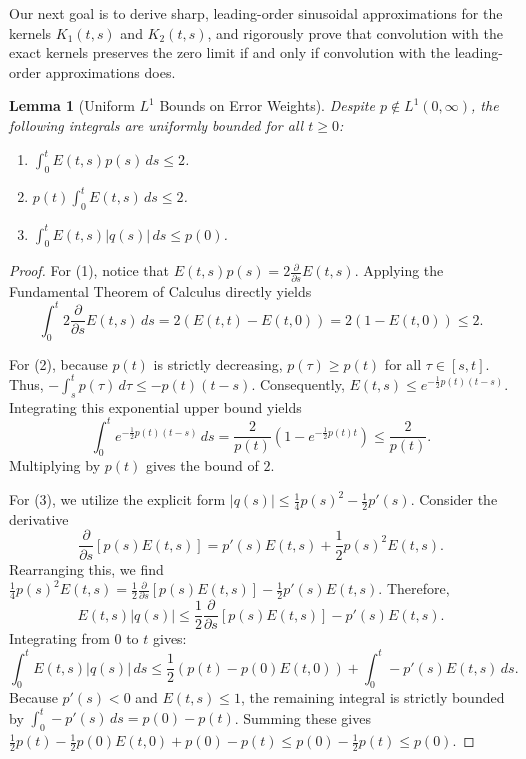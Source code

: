 \documentclass[10pt,reqno]{amsart}
\newtheorem{lemma}[theorem]{Lemma}
\theoremstyle{definition}
\begin{document}
Our next goal is to derive sharp, leading-order sinusoidal approximations for the kernels $K_1(t, s)$ and $K_2(t, s)$, and rigorously prove that convolution with the exact kernels preserves the zero limit if and only if convolution with the leading-order approximations does.
	
	\begin{lemma}[Uniform $L^1$ Bounds on Error Weights] \label{lem:uniform_bounds}
		Despite $p \notin L^1(0, \infty)$, the following integrals are uniformly bounded for all $t \ge 0$:
		\begin{enumerate}
			\item $\int_0^t E(t, s) p(s) \, ds \le 2$.
			\item $p(t) \int_0^t E(t, s) \, ds \le 2$.
			\item $\int_0^t E(t, s) |q(s)| \, ds \le p(0)$.
		\end{enumerate}
	\end{lemma}
	
	\begin{proof}
		For (1), notice that $E(t, s) p(s) = 2 \frac{\partial}{\partial s} E(t, s)$. Applying the Fundamental Theorem of Calculus directly yields $$\int_0^t 2 \frac{\partial}{\partial s} E(t, s) \, ds = 2(E(t, t) - E(t, 0)) = 2(1 - E(t, 0)) \le 2.$$
		
		For (2), because $p(t)$ is strictly decreasing, $p(\tau) \ge p(t)$ for all $\tau \in [s, t]$. Thus, $-\int_s^t p(\tau) \, d\tau \le -p(t)(t-s)$. Consequently, $E(t, s) \le e^{-\frac{1}{2}p(t)(t-s)}$. Integrating this exponential upper bound yields $$\int_0^t e^{-\frac{1}{2}p(t)(t-s)} \, ds = \frac{2}{p(t)}(1 - e^{-\frac{1}{2}p(t)t}) \le \frac{2}{p(t)}.$$ 
		Multiplying by $p(t)$ gives the bound of $2$.
		
		For (3), we utilize the explicit form $|q(s)| \le \frac{1}{4}p(s)^2 - \frac{1}{2}p'(s)$. Consider the derivative $$\frac{\partial}{\partial s} [p(s) E(t, s)] = p'(s) E(t, s) + \frac{1}{2}p(s)^2 E(t, s).$$ Rearranging this, we find $\frac{1}{4}p(s)^2 E(t, s) = \frac{1}{2} \frac{\partial}{\partial s}[p(s) E(t, s)] - \frac{1}{2}p'(s) E(t, s)$. 
		Therefore, $$E(t, s)|q(s)| \le \frac{1}{2} \frac{\partial}{\partial s}[p(s) E(t, s)] - p'(s) E(t, s).$$ 
		Integrating from $0$ to $t$ gives:
		\[ \int_0^t E(t, s)|q(s)| \, ds \le \frac{1}{2}(p(t) - p(0)E(t, 0)) + \int_0^t -p'(s) E(t, s) \, ds. \]
		Because $p'(s) < 0$ and $E(t, s) \le 1$, the remaining integral is strictly bounded by $\int_0^t -p'(s) \, ds = p(0) - p(t)$. Summing these gives $\frac{1}{2}p(t) - \frac{1}{2}p(0)E(t, 0) + p(0) - p(t) \le p(0) - \frac{1}{2}p(t) \le p(0)$.
	\end{proof}
	
\end{document}
